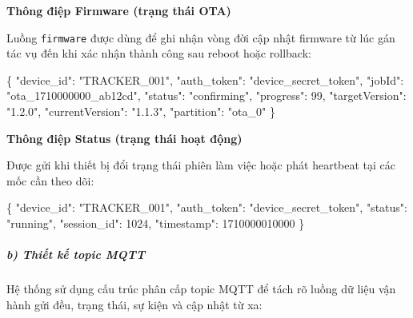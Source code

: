\documentclass[a4paper]{extarticle}
\newenvironment{Shaded}{}{}
\newcommand{\DataTypeTok}[1]{\textcolor[rgb]{0.56,0.13,0.00}{#1}}
\newcommand{\DecValTok}[1]{\textcolor[rgb]{0.25,0.63,0.44}{#1}}
\newcommand{\FunctionTok}[1]{\textcolor[rgb]{0.02,0.16,0.49}{#1}}
\newcommand{\StringTok}[1]{\textcolor[rgb]{0.25,0.44,0.63}{#1}}
\begin{document}
\textbf{Thông điệp Firmware (trạng thái OTA)}

Luồng \texttt{firmware} được dùng để ghi nhận vòng đời cập nhật firmware
từ lúc gán tác vụ đến khi xác nhận thành công sau reboot hoặc rollback:

\begin{Shaded}
\begin{Highlighting}[]
\FunctionTok{\{}
  \DataTypeTok{"device\_id"}\FunctionTok{:} \StringTok{"TRACKER\_001"}\FunctionTok{,}
  \DataTypeTok{"auth\_token"}\FunctionTok{:} \StringTok{"device\_secret\_token"}\FunctionTok{,}
  \DataTypeTok{"jobId"}\FunctionTok{:} \StringTok{"ota\_1710000000\_ab12cd"}\FunctionTok{,}
  \DataTypeTok{"status"}\FunctionTok{:} \StringTok{"confirming"}\FunctionTok{,}
  \DataTypeTok{"progress"}\FunctionTok{:} \DecValTok{99}\FunctionTok{,}
  \DataTypeTok{"targetVersion"}\FunctionTok{:} \StringTok{"1.2.0"}\FunctionTok{,}
  \DataTypeTok{"currentVersion"}\FunctionTok{:} \StringTok{"1.1.3"}\FunctionTok{,}
  \DataTypeTok{"partition"}\FunctionTok{:} \StringTok{"ota\_0"}
\FunctionTok{\}}
\end{Highlighting}
\end{Shaded}

\textbf{Thông điệp Status (trạng thái hoạt động)}

Được gửi khi thiết bị đổi trạng thái phiên làm việc hoặc phát heartbeat
tại các mốc cần theo dõi:

\begin{Shaded}
\begin{Highlighting}[]
\FunctionTok{\{}
  \DataTypeTok{"device\_id"}\FunctionTok{:} \StringTok{"TRACKER\_001"}\FunctionTok{,}
  \DataTypeTok{"auth\_token"}\FunctionTok{:} \StringTok{"device\_secret\_token"}\FunctionTok{,}
  \DataTypeTok{"status"}\FunctionTok{:} \StringTok{"running"}\FunctionTok{,}
  \DataTypeTok{"session\_id"}\FunctionTok{:} \DecValTok{1024}\FunctionTok{,}
  \DataTypeTok{"timestamp"}\FunctionTok{:} \DecValTok{1710000010000}
\FunctionTok{\}}
\end{Highlighting}
\end{Shaded}

\subparagraph{b) Thiết kế topic
MQTT}\label{b-thiux1ebft-kux1ebf-mqtt-topic}

Hệ thống sử dụng cấu trúc phân cấp topic MQTT để tách rõ luồng
dữ liệu vận hành gửi đều, trạng thái, sự kiện và cập nhật từ xa:
\end{document}
